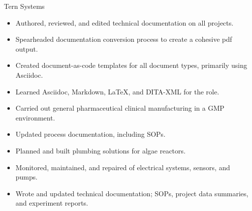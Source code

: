 \documentclass[11pt,oneside,a4paper,titlepage]{article}
\begin{document}
{\begin{minipage}{11.3cm}
        \vspace*{0.12cm}
    
        {Tern Systems}
        {\begin{itemize} \scriptsize
            \item Authored, reviewed, and edited technical documentation on all projects.
            \item Spearheaded documentation conversion process to create a cohesive pdf output.
            \item Created document-as-code templates for all  document types, primarily using Asciidoc.
            \item Learned Asciidoc, Markdown, LaTeX, and DITA-XML for the role. 
        \end{itemize}}  
        
        \vspace*{0.12cm}
            
        {\begin{itemize} \scriptsize
            \item Carried out general pharmaceutical clinical manufacturing in a GMP environment. 
            \item Updated process documentation, including SOPs.
        \end{itemize}}
        
        \vspace*{0.12cm}
        
        {\begin{itemize} \scriptsize
            \item Planned and built plumbing solutions for algae reactors. 
            \item Monitored, maintained, and repaired of electrical systems, sensors, and pumps. 
            \item Wrote and updated technical documentation; SOPs, project data summaries, and experiment reports.
        \end{itemize}}
    \end{minipage}} %
\end{document}
